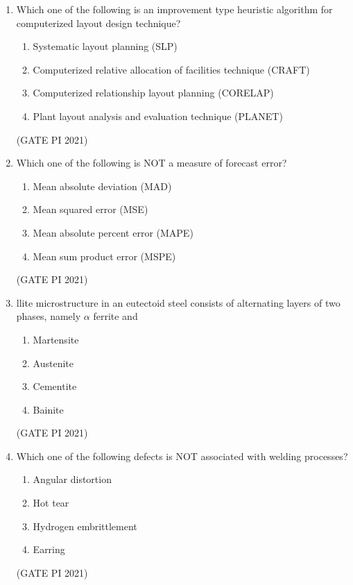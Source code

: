 \documentclass[journal,12pt,onecolumn]{IEEEtran}
\theoremstyle{remark}
\begin{document}
\begin{enumerate}
\item
Which one of the following is an improvement type heuristic algorithm for computerized layout design technique?

\begin{enumerate}
\item Systematic layout planning (SLP)
\item Computerized relative allocation of facilities technique (CRAFT)
\item Computerized relationship layout planning (CORELAP)
\item Plant layout analysis and evaluation technique (PLANET)
\end{enumerate}

\hfill (GATE PI 2021)

\item
Which one of the following is NOT a measure of forecast error?

\begin{enumerate}
\item Mean absolute deviation (MAD)
\item Mean squared error (MSE)
\item Mean absolute percent error (MAPE)
\item Mean sum product error (MSPE)
\end{enumerate}
\hfill (GATE PI 2021)

\item
llite microstructure in an eutectoid steel consists of alternating layers of two phases, namely $\alpha$ ferrite and
\begin{multicols}{4}
\begin{enumerate}
\item Martensite
\item Austenite
\item Cementite
\item Bainite
\end{enumerate}
\end{multicols}
\hfill (GATE PI 2021)

\item
Which one of the following defects is NOT associated with welding processes?
\begin{multicols}{4}
\begin{enumerate}
\item Angular distortion
\item Hot tear
\item Hydrogen embrittlement
\item Earring
\end{enumerate}
\end{multicols}
\hfill (GATE PI 2021)


\end{enumerate}
\end{document}
